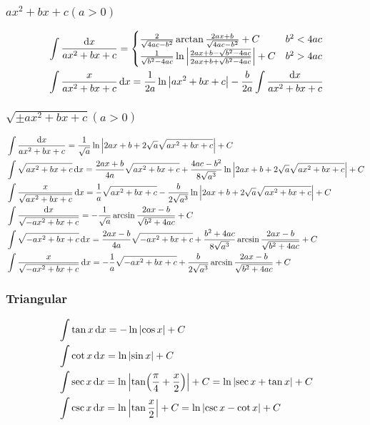 \subsubsection{$ax^2+bx+c(a>0)$}
	\begin{align*}
		&\int\frac{\dd{x}}{ax^2+bx+c}=\begin{cases}
			\frac{2}{\sqrt{4ac-b^2}}\arctan\frac{2ax+b}{\sqrt{4ac-b^2}}+C							&b^2<4ac\\
			\frac{1}{\sqrt{b^2-4ac}}\ln\abs{\frac{2ax+b-\sqrt{b^2-4ac}}{2ax+b+\sqrt{b^2-4ac}}}+C	&b^2>4ac\\
		\end{cases}\\
		&\int\frac{x}{ax^2+bx+c}\dd{x}=\frac{1}{2a}\ln\abs{ax^2+bx+c}-\frac{b}{2a}\int\frac{\dd{x}}{ax^2+bx+c}\\
	\end{align*}
\subsubsection{$\sqrt{\pm ax^2+bx+c}(a>0)$}
	\begin{align*}
		&\int\frac{\dd{x}}{ax^2+bx+c}=\frac{1}{\sqrt{a}}\ln\abs{2ax+b+2\sqrt{a}\sqrt{ax^2+bx+c}}+C\\
		&\int\sqrt{ax^2+bx+c}\dd{x}=\frac{2ax+b}{4a}\sqrt{ax^2+bx+c}+\frac{4ac-b^2}{8\sqrt{a^3}}\ln\abs{2ax+b+2\sqrt{a}\sqrt{ax^2+bx+c}}+C\\
		&\int\frac{x}{\sqrt{ax^2+bx+c}}\dd{x}=\frac{1}{a}\sqrt{ax^2+bx+c}-\frac{b}{2\sqrt{a^3}}\ln\abs{2ax+b+2\sqrt{a}\sqrt{ax^2+bx+c}}+C\\
		&\int\frac{\dd{x}}{\sqrt{-ax^2+bx+c}}=-\frac{1}{\sqrt{a}}\arcsin\frac{2ax-b}{\sqrt{b^2+4ac}}+C\\
		&\int\sqrt{-ax^2+bx+c}\dd{x}=\frac{2ax-b}{4a}\sqrt{-ax^2+bx+c}+\frac{b^2+4ac}{8\sqrt{a^3}}\arcsin\frac{2ax-b}{\sqrt{b^2+4ac}}+C\\
		&\int\frac{x}{\sqrt{-ax^2+bx+c}}\dd{x}=-\frac{1}{a}\sqrt{-ax^2+bx+c}+\frac{b}{2\sqrt{a^3}}\arcsin\frac{2ax-b}{\sqrt{b^2+4ac}}+C\\
	\end{align*}
\subsubsection{Triangular}
	\begin{align*}
		&\int\tan x\dd{x}=-\ln\abs{\cos x}+C\\
		&\int\cot x\dd{x}=\ln\abs{\sin x}+C\\
		&\int\sec x\dd{x}=\ln\abs{\tan(\frac{\pi}{4}+\frac{x}{2})}+C=\ln\abs{\sec x+\tan x}+C\\
		&\int\csc x\dd{x}=\ln\abs{\tan\frac{x}{2}}+C=\ln\abs{\csc x-\cot x}+C\\
	\end{align*}
